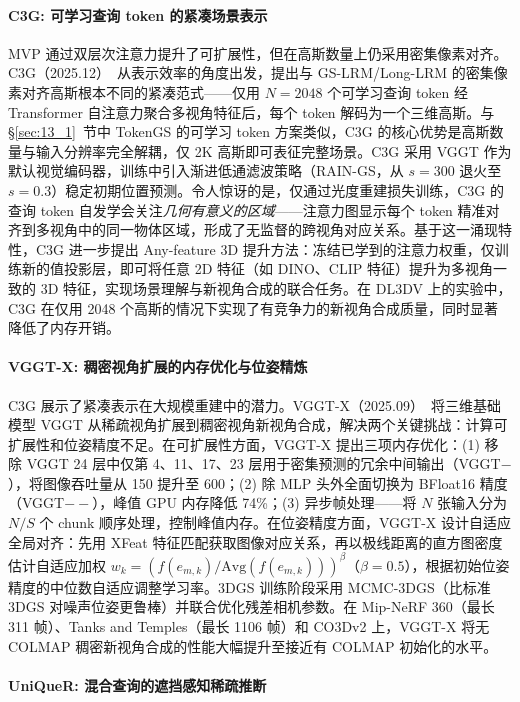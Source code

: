 \paragraph{C3G: 可学习查询 token 的紧凑场景表示}

MVP 通过双层次注意力提升了可扩展性，但在高斯数量上仍采用密集像素对齐。C3G（2025.12）~\cite{2512_04021}从表示效率的角度出发，提出与 GS-LRM/Long-LRM 的密集像素对齐高斯根本不同的紧凑范式——仅用 $N{=}2048$ 个可学习查询 token 经 Transformer 自注意力聚合多视角特征后，每个 token 解码为一个三维高斯。与 §\ref{sec:13_1}~节中 TokenGS 的可学习 token 方案类似，C3G 的核心优势是高斯数量与输入分辨率完全解耦，仅 2K 高斯即可表征完整场景。C3G 采用 VGGT 作为默认视觉编码器，训练中引入渐进低通滤波策略（RAIN-GS，从 $s{=}300$ 退火至 $s{=}0.3$）稳定初期位置预测。令人惊讶的是，仅通过光度重建损失训练，C3G 的查询 token 自发学会关注\emph{几何有意义的区域}——注意力图显示每个 token 精准对齐到多视角中的同一物体区域，形成了无监督的跨视角对应关系。基于这一涌现特性，C3G 进一步提出 Any-feature 3D 提升方法：冻结已学到的注意力权重，仅训练新的值投影层，即可将任意 2D 特征（如 DINO、CLIP 特征）提升为多视角一致的 3D 特征，实现场景理解与新视角合成的联合任务。在 DL3DV 上的实验中，C3G 在仅用 2048 个高斯的情况下实现了有竞争力的新视角合成质量，同时显著降低了内存开销。

\paragraph{VGGT-X: 稠密视角扩展的内存优化与位姿精炼}

C3G 展示了紧凑表示在大规模重建中的潜力。VGGT-X（2025.09）~\cite{2509_25191}将三维基础模型 VGGT 从稀疏视角扩展到稠密视角新视角合成，解决两个关键挑战：计算可扩展性和位姿精度不足。在可扩展性方面，VGGT-X 提出三项内存优化：(1) 移除 VGGT 24 层中仅第 4、11、17、23 层用于密集预测的冗余中间输出（VGGT$-$），将图像吞吐量从 150 提升至 600；(2) 除 MLP 头外全面切换为 BFloat16 精度（VGGT$--$），峰值 GPU 内存降低 74\%；(3) 异步帧处理——将 $N$ 张输入分为 $N/S$ 个 chunk 顺序处理，控制峰值内存。在位姿精度方面，VGGT-X 设计自适应全局对齐：先用 XFeat 特征匹配获取图像对应关系，再以极线距离的直方图密度估计自适应加权 $w_k = (f(e_{m,k}) / \text{Avg}(f(e_{m,k})))^\beta$（$\beta{=}0.5$），根据初始位姿精度的中位数自适应调整学习率。3DGS 训练阶段采用 MCMC-3DGS（比标准 3DGS 对噪声位姿更鲁棒）并联合优化残差相机参数。在 Mip-NeRF 360（最长 311 帧）、Tanks and Temples（最长 1106 帧）和 CO3Dv2 上，VGGT-X 将无 COLMAP 稠密新视角合成的性能大幅提升至接近有 COLMAP 初始化的水平。

\paragraph{UniQueR: 混合查询的遮挡感知稀疏推断}

